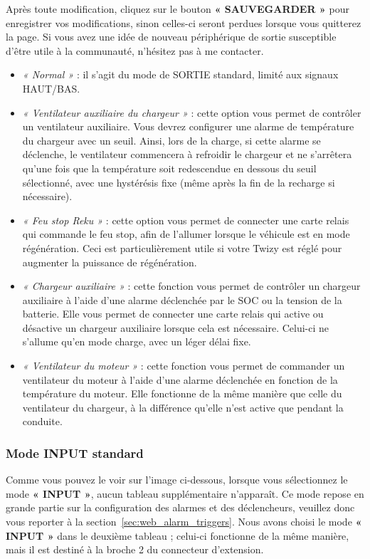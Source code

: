 Après toute modification, cliquez sur le bouton \textbf{« SAUVEGARDER »} pour enregistrer vos modifications, sinon celles-ci seront perdues lorsque vous quitterez la page.
Si vous avez une idée de nouveau périphérique de sortie susceptible d’être utile à la communauté, n’hésitez pas à me contacter.\\

\begin{itemize}
    \item \textit{« Normal »} : il s’agit du mode de SORTIE standard, limité aux signaux HAUT/BAS.
    \item \textit{« Ventilateur auxiliaire du chargeur »} : cette option vous permet de contrôler un ventilateur auxiliaire. 
    Vous devrez configurer une alarme de température du chargeur avec un seuil. Ainsi, lors de la charge, si 
    cette alarme se déclenche, le ventilateur commencera à refroidir le chargeur et ne s’arrêtera qu’une fois que la température
    soit redescendue en dessous du seuil sélectionné, avec une hystérésis fixe (même après la fin de la recharge si nécessaire).
    \item \textit{« Feu stop Reku »} : cette option vous permet de connecter une carte relais qui commande
    le feu stop, afin de l'allumer lorsque le véhicule est en mode régénération. Ceci est particulièrement
    utile si votre Twizy est réglé pour augmenter la puissance de régénération.
    \item \textit{« Chargeur auxiliaire »} : cette fonction vous permet de contrôler un chargeur auxiliaire à l’aide d’une
    alarme déclenchée par le SOC ou la tension de la batterie. Elle vous permet de connecter une carte relais qui active ou désactive un
    chargeur auxiliaire lorsque cela est nécessaire. Celui-ci ne s’allume qu’en mode charge, avec un léger délai fixe.
    \item \textit{« Ventilateur du moteur »} : cette fonction vous permet de commander un ventilateur du moteur à l’aide d’une alarme déclenchée en fonction de la température du moteur.
    Elle fonctionne de la même manière que celle du ventilateur du chargeur, à la différence qu’elle n’est active que pendant la conduite.
\end{itemize}

\subsubsection{Mode INPUT standard}

Comme vous pouvez le voir sur l’image ci-dessous, lorsque vous sélectionnez le mode \textbf{« INPUT »}, aucun tableau supplémentaire n’apparaît.
Ce mode repose en grande partie sur la configuration des alarmes et des déclencheurs, veuillez donc vous reporter à la section~\ref{sec:web_alarm_triggers}.
Nous avons choisi le mode \textbf{« INPUT »} dans le deuxième tableau ; celui-ci fonctionne de la même manière, mais il est destiné à la broche 2 du connecteur d’extension.

